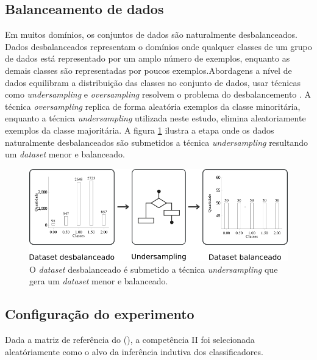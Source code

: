 \subsection{Balanceamento de dados}

Em muitos domínios, os conjuntos de dados são naturalmente desbalanceados. 
Dados desbalanceados representam o domínios onde qualquer classes de um grupo 
de dados está representado por um amplo número de exemplos, enquanto as demais 
classes são representadas por poucos exemplos.Abordagens a nível de dados 
equilibram a distribuição das classes no conjunto de dados, usar técnicas como 
\textit{undersampling} e \textit{oversampling} resolvem o problema do 
desbalancemento \cite{ferreiraestudo}. A técnica \textit{oversampling} replica 
de forma aleatória exemplos da classe minoritária, enquanto a técnica 
\textit{undersampling} utilizada neste estudo, elimina aleatoriamente exemplos 
da classe majoritária. A figura \ref{figure:metodologia_2} ilustra a etapa onde 
os dados naturalmente desbalanceados são submetidos a técnica 
\textit{undersampling} resultando um \textit{dataset} menor e balanceado.

\begin{figure}[H]
\begin{center}
    \includegraphics[scale=0.70]{images/metodologia_2.png}
\end{center}
\caption{O \textit{dataset} desbalanceado é submetido a técnica
\textit{undersampling} que gera um \textit{dataset} menor e balanceado.}
\label{figure:metodologia_2}
\end{figure}

\subsection{Configuração do experimento}

Dada a matriz de referência do \citeauthor{matriz_referencia_redacao:2016} 
(\citeyear{matriz_referencia_redacao:2016}), a competência II foi selecionada 
aleatóriamente como o alvo da inferência indutiva dos classificadores. 

